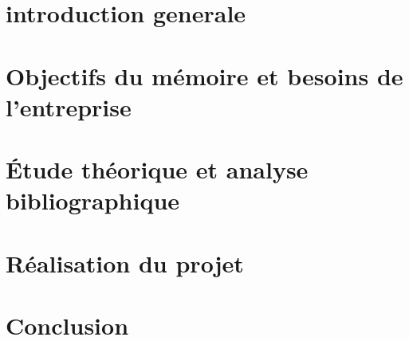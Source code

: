 \chapter*{introduction generale}


\chapter{Objectifs du mémoire et besoins de l’entreprise}\label{chapter:objectifs_besoins}


\chapter{Étude théorique et analyse bibliographique}\label{chapter:etude_theorique}


\chapter{Réalisation du projet}\label{chapter:realisation_projet}


\chapter*{Conclusion}

